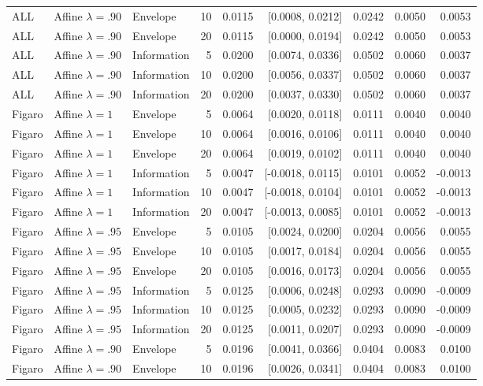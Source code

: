 \begin{longtable}{lllrrrrrr}
ALL & Affine $\lambda=.90$ & Envelope & 10 & 0.0115 & [0.0008, 0.0212] & 0.0242 & 0.0050 & 0.0053 \\
ALL & Affine $\lambda=.90$ & Envelope & 20 & 0.0115 & [0.0000, 0.0194] & 0.0242 & 0.0050 & 0.0053 \\
ALL & Affine $\lambda=.90$ & Information & 5 & 0.0200 & [0.0074, 0.0336] & 0.0502 & 0.0060 & 0.0037 \\
ALL & Affine $\lambda=.90$ & Information & 10 & 0.0200 & [0.0056, 0.0337] & 0.0502 & 0.0060 & 0.0037 \\
ALL & Affine $\lambda=.90$ & Information & 20 & 0.0200 & [0.0037, 0.0330] & 0.0502 & 0.0060 & 0.0037 \\
Figaro & Affine $\lambda=1$ & Envelope & 5 & 0.0064 & [0.0020, 0.0118] & 0.0111 & 0.0040 & 0.0040 \\
Figaro & Affine $\lambda=1$ & Envelope & 10 & 0.0064 & [0.0016, 0.0106] & 0.0111 & 0.0040 & 0.0040 \\
Figaro & Affine $\lambda=1$ & Envelope & 20 & 0.0064 & [0.0019, 0.0102] & 0.0111 & 0.0040 & 0.0040 \\
Figaro & Affine $\lambda=1$ & Information & 5 & 0.0047 & [-0.0018, 0.0115] & 0.0101 & 0.0052 & -0.0013 \\
Figaro & Affine $\lambda=1$ & Information & 10 & 0.0047 & [-0.0018, 0.0104] & 0.0101 & 0.0052 & -0.0013 \\
Figaro & Affine $\lambda=1$ & Information & 20 & 0.0047 & [-0.0013, 0.0085] & 0.0101 & 0.0052 & -0.0013 \\
Figaro & Affine $\lambda=.95$ & Envelope & 5 & 0.0105 & [0.0024, 0.0200] & 0.0204 & 0.0056 & 0.0055 \\
Figaro & Affine $\lambda=.95$ & Envelope & 10 & 0.0105 & [0.0017, 0.0184] & 0.0204 & 0.0056 & 0.0055 \\
Figaro & Affine $\lambda=.95$ & Envelope & 20 & 0.0105 & [0.0016, 0.0173] & 0.0204 & 0.0056 & 0.0055 \\
Figaro & Affine $\lambda=.95$ & Information & 5 & 0.0125 & [0.0006, 0.0248] & 0.0293 & 0.0090 & -0.0009 \\
Figaro & Affine $\lambda=.95$ & Information & 10 & 0.0125 & [0.0005, 0.0232] & 0.0293 & 0.0090 & -0.0009 \\
Figaro & Affine $\lambda=.95$ & Information & 20 & 0.0125 & [0.0011, 0.0207] & 0.0293 & 0.0090 & -0.0009 \\
Figaro & Affine $\lambda=.90$ & Envelope & 5 & 0.0196 & [0.0041, 0.0366] & 0.0404 & 0.0083 & 0.0100 \\
Figaro & Affine $\lambda=.90$ & Envelope & 10 & 0.0196 & [0.0026, 0.0341] & 0.0404 & 0.0083 & 0.0100 \\

\end{longtable}
